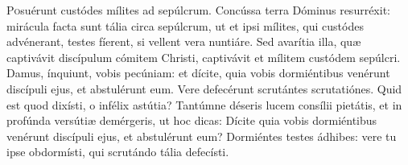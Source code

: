 
\lettrine{P}{o}suérunt custódes mílites ad sepúlcrum. Concússa terra Dóminus resurréxit: mirácula facta sunt tália circa sepúlcrum, ut et ipsi mílites, qui custódes advénerant, testes fíerent, si vellent vera nuntiáre. Sed avarítia illa, quæ captivávit discípulum cómitem Christi, captivávit et mílitem custódem sepúlcri. Damus, ínquiunt, vobis pecúniam: et dícite, quia vobis dormiéntibus venérunt discípuli ejus, et abstulérunt eum. Vere defecérunt scrutántes scrutatiónes. Quid est quod dixísti, o infélix astútia? Tantúmne déseris lucem consílii pietátis, et in profúnda versútiæ demérgeris, ut hoc dicas: Dícite quia vobis dormiéntibus venérunt discípuli ejus, et abstulérunt eum? Dormiéntes testes ádhibes: vere tu ipse obdormísti, qui scrutándo tália defecísti.